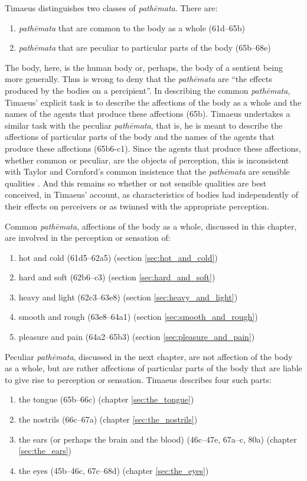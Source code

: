 Timaeus distinguishes two classes of \emph{pathēmata}. There are:
\begin{enumerate}[(1)]
	\item \emph{pathēmata} that are common to the body as a whole (61d--65b)
	\item \emph{pathēmata} that are peculiar to particular parts of the body (65b--68e)
\end{enumerate}
The body, here, is the human body or, perhaps, the body of a sentient being more generally. Thus \citet[431]{Taylor:1928qb} is wrong to deny that the \emph{pathēmata} are ``the effects produced by the bodies on a percipient''. In describing the common \emph{pathēmata}, Timaeus' explicit task is to describe the affections of the body as a whole and the names of the agents that produce these affections (65b). Timaeus undertakes a similar task with the peculiar \emph{pathēmata}, that is, he is meant to describe the affections of particular parts of the body and the names of the agents that produce these affections (65b6-c1). Since the agents that produce these affections, whether common or peculiar, are the objects of perception, this is inconsistent with Taylor and Cornford's common insistence that the \emph{pathēmata} are sensible qualities \citep[see][225, n8]{Archer-Hind:1888qd}. And this remains so whether or not sensible qualities are best conceived, in Timaeus' account, as characteristics of bodies had independently of their effects on perceivers or as twinned with the appropriate perception. 

Common \emph{pathēmata}, affections of the body as a whole, discussed in this chapter, are involved in the perception or sensation of:
\begin{enumerate}[(1)]
 	\item hot and cold (61d5--62a5) (section \ref{sec:hot_and_cold})
 	\item hard and soft (62b6--c3) (section \ref{sec:hard_and_soft})
 	\item heavy and light (62c3--63e8) (section \ref{sec:heavy_and_light})
 	\item smooth and rough (63e8--64a1) (section \ref{sec:smooth_and_rough})
 	\item pleasure and pain (64a2--65b3) (section \ref{sec:pleasure_and_pain})
\end{enumerate}

Peculiar \emph{pathēmata}, discussed in the next chapter, are not affection of the body as a whole, but are rather affections of particular parts of the body that are liable to give rise to perception or sensation. Timaeus describes four such parts:
\begin{enumerate}[(1)]
	\item the tongue (65b--66c) (chapter \ref{sec:the_tongue})
	\item the nostrils (66c--67a) (chapter \ref{sec:the_nostrils})
	\item the ears (or perhaps the brain and the blood) (46c--47e, 67a--c, 80a) (chapter \ref{sec:the_ears})
	\item the eyes (45b--46c, 67c--68d) (chapter \ref{sec:the_eyes})
\end{enumerate}

